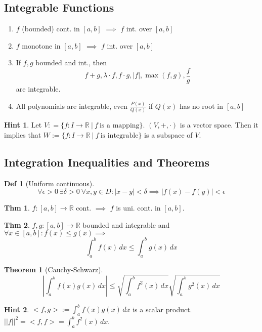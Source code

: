 \documentclass[a4paper, 10pt]{article}
\theoremstyle{definition}
\newtheorem*{theorem}{Thm}
\newtheorem*{definition}{Def}
\newtheorem*{note_wrapper}{Hint}
\theoremstyle{named}
\newtheorem*{ntheorem_wrapper}{Theorem}
\newenvironment{ntheorem}%
    {\begin{mdframed}[style=important]\begin{ntheorem_wrapper}}%
    {\end{ntheorem_wrapper}\end{mdframed}}
\newenvironment{note}%
    {\begin{mdframed}[style=trick]\begin{note_wrapper}}%
    {\end{note_wrapper}\end{mdframed}}
\newcommand{\R}{\mathbb{R}}
\begin{document}
\subsection{Integrable Functions}
\begin{enumerate}
    \item $f$ (bounded) cont. in $[a, b]$ $\implies$ $f$ int. over $[a, b]$
    \item $f$ monotone in $[a, b]$ $\implies$ $f$ int. over $[a, b]$
    \item If $f, g$ bounded and int., then
    $$f + g, \lambda \cdot f, f \cdot g, |f|, \max(f,g), \frac{f}{g}$$ are integrable.
    \item All polynomials are integrable, even $\frac{P(x)}{Q(x)}$ if $Q(x)$ has no root in $[a, b]$
\end{enumerate}

\begin{note}
    Let $V: = \{f: I \to \R \ | \ f \ \text{is a mapping}\}$. $(V, +, \cdot)$ is a vector space.
    Then it implies that $W := \{f: I \to \R \ | \ f \ \text{is integrable}\}$ is a subspace of $V$.
\end{note}

\subsection{Integration Inequalities and Theorems}
\begin{definition}[Uniform continuous]
    $$\forall \epsilon > 0 \ \exists \delta > 0 \ \forall x,y \in D: |x - y| < \delta \implies |f(x) - f(y)| < \epsilon $$
\end{definition}

\begin{theorem}
    $f: [a, b] \to \R$ cont. $\implies$ $f$ is uni. cont. in $[a, b]$.
\end{theorem}

\begin{theorem}
    $f, g: [a, b] \to \R$ bounded and integrable and $\forall x \in [a, b]: f(x) \leq g(x) \implies$
    $$\int_a^b f(x) \,dx \leq \int_a^b g(x) \,dx$$
\end{theorem}

\begin{ntheorem}[Cauchy-Schwarz]
    $$\left|\int_a^b f(x)g(x) \,dx\right| \leq \sqrt{\int_a^b f^2(x) \,dx}\sqrt{\int_a^b g^2(x) \,dx}$$
\end{ntheorem}

\begin{note}
    $<f, g> := \int_a^b f(x)g(x) \,dx$ is a scalar product. \newline
    $||f||^2 = <f, f> = \int_a^b f^2(x) \,dx$.
\end{note}
\end{document}
